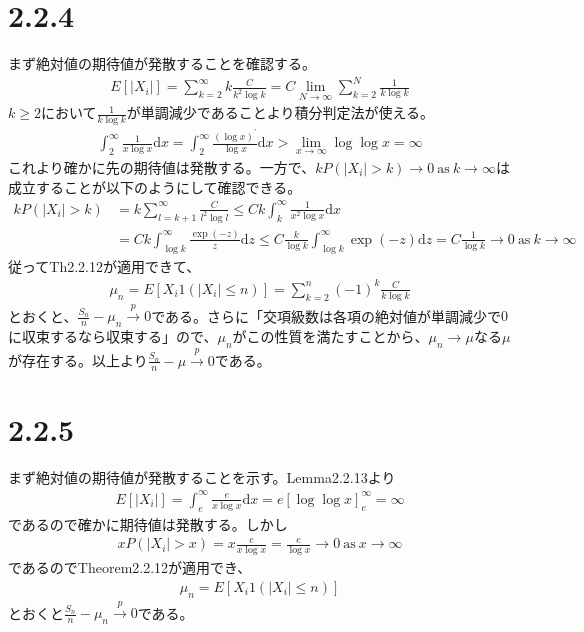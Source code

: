 \documentclass{article}
\begin{document}
\section{2.2.4}
まず絶対値の期待値が発散することを確認する。
\begin{align*}
	E\left[ |X_i| \right] = \sum_{k = 2}^{\infty} k \frac{C}{k^2 \log k} = C \lim_{N \to \infty} \sum_{k = 2}^{N} \frac{1}{k \log k}
\end{align*}
$k \geq 2$において$\frac{1}{k \log k}$が単調減少であることより積分判定法が使える。
\begin{align*}
	\int_2^{\infty} \frac{1}{x\log x} \mathrm{d}x = \int_2^{\infty} \frac{\left( \log x \right)^{\prime}}{\log x} \mathrm{d}x > \lim_{x\to \infty} \log \log x = \infty
\end{align*}
これより確かに先の期待値は発散する。一方で、$k P\left( |X_i| > k \right) \to 0\ \text{as}\ k \to \infty$は成立することが以下のようにして確認できる。
\begin{align*}
	k P\left( |X_i| > k \right) &= k \sum_{l = k+1}^{\infty} \frac{C}{l^2 \log l} \leq Ck \int_k^{\infty} \frac{1}{x^2 \log x} \mathrm{d}x\\
	&= Ck \int_{\log k}^{\infty} \frac{\exp(-z)}{z} \mathrm{d}z \leq C \frac{k}{\log k} \int_{\log k}^{\infty} \exp(-z) \mathrm{d}z = C \frac{1}{\log k} \to 0\ \text{as}\ k \to \infty
\end{align*}
従ってTh2.2.12が適用できて、
\begin{align*}
	\mu_n = E\left[ X_i 1\left( |X_i| \leq n \right) \right] = \sum_{k = 2}^{n} (-1)^k \frac{C}{k \log k}
\end{align*}
とおくと、$\frac{S_n}{n} - \mu_n \xrightarrow{p} 0$である。さらに「交項級数は各項の絶対値が単調減少で$0$に収束するなら収束する」ので、$\mu_n$がこの性質を満たすことから、$\mu_n \to \mu$なる$\mu$が存在する。以上より$\frac{S_n}{n} - \mu \xrightarrow{p} 0$である。


\section{2.2.5}
まず絶対値の期待値が発散することを示す。Lemma2.2.13より
\begin{align*}
	E\left[ |X_i| \right] = \int_e^{\infty} \frac{e}{x\log x} \mathrm{d}x = e\left[ \log \log x \right]_e^{\infty} = \infty
\end{align*}
であるので確かに期待値は発散する。しかし
\begin{align*}
	x P\left( |X_i| > x \right) = x \frac{e}{x \log x} = \frac{e}{\log x} \to 0\ \text{as}\ x\to \infty
\end{align*}
であるのでTheorem2.2.12が適用でき、
\begin{align*}
	\mu_n = E\left[ X_i 1\left(|X_i| \leq n\right) \right]
\end{align*}
とおくと$\frac{S_n}{n} - \mu_n \xrightarrow{p} 0$である。
\end{document}
